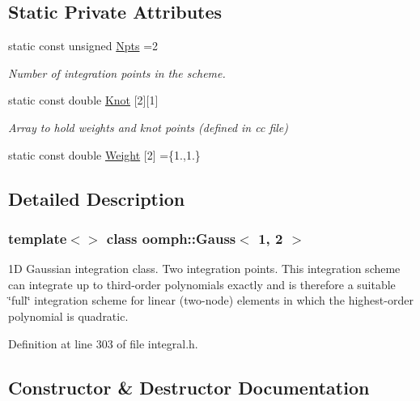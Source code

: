 \subsection*{Static Private Attributes}
\begin{DoxyCompactItemize}
\item 
static const unsigned \hyperlink{classoomph_1_1Gauss_3_011_00_012_01_4_a48c241a8812e55bb89ebcf0f7803050b}{Npts} =2
\begin{DoxyCompactList}\small\item\em Number of integration points in the scheme. \end{DoxyCompactList}\item 
static const double \hyperlink{classoomph_1_1Gauss_3_011_00_012_01_4_a9b1181c72075e2d9adf54b7a9f823f8e}{Knot} \mbox{[}2\mbox{]}\mbox{[}1\mbox{]}
\begin{DoxyCompactList}\small\item\em Array to hold weights and knot points (defined in cc file) \end{DoxyCompactList}\item 
static const double \hyperlink{classoomph_1_1Gauss_3_011_00_012_01_4_a5123dd00cb3e7c4a1d95a7b65a553bfc}{Weight} \mbox{[}2\mbox{]} =\{1.,1.\}
\end{DoxyCompactItemize}


\subsection{Detailed Description}
\subsubsection*{template$<$$>$\newline
class oomph\+::\+Gauss$<$ 1, 2 $>$}

1D Gaussian integration class. Two integration points. This integration scheme can integrate up to third-\/order polynomials exactly and is therefore a suitable \char`\"{}full\char`\"{} integration scheme for linear (two-\/node) elements in which the highest-\/order polynomial is quadratic. 

Definition at line 303 of file integral.\+h.



\subsection{Constructor \& Destructor Documentation}
\mbox{\label{classoomph_1_1Gauss_3_011_00_012_01_4_a3600224d34344632f5207822eb5d4c34}} 

